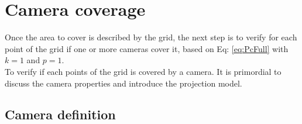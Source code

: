 \section{Camera coverage}\label{sec:CamerasCoverage}


Once the area to cover is described by the grid, the next step is to verify for each point of the grid if one or more cameras cover it, based on Eq: \ref{eq:PcFull} with $k=1$ and $p=1$.\\
To verify if each points of the grid is covered by a camera. It is primordial to discuss the camera properties and introduce the projection model.

\subsection{Camera definition}\label{sec:CamerasDefinition}

